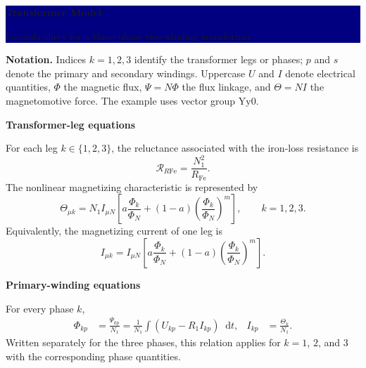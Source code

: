 \documentclass[11pt,a4paper]{article}
\newenvironment{formulaBox}[1]{%
	\par\medskip
	{\sffamily\bfseries\large\color{navy}#1}\par\nobreak\smallskip
	\def\FrameCommand{\hspace{1pt}{\color{blue}\vrule width 2.2pt}\hspace{8pt}}%
	\MakeFramed{\advance\hsize-11.2pt\FrameRestore}%
}{\endMakeFramed\par\smallskip}
\newenvironment{noteBox}{%
	\par\smallskip
	\def\FrameCommand{\hspace{1pt}{\color{gold}\vrule width 2.2pt}%
		\colorbox{shadecolor}}%
	\MakeFramed{\advance\hsize-2\width\advance\hsize-2\fboxsep\FrameRestore}%
}{\endMakeFramed\par\smallskip}
\newcommand{\diff}{\mathop{}\!\mathrm{d}}
\newcommand{\Rmag}{\mathcal{R}}
\begin{document}
	
	\begingroup
	\setlength{\fboxsep}{8mm}%
	\noindent\colorbox{navy}{%
		\parbox{\dimexpr\textwidth-2\fboxsep\relax}{%
			{\sffamily\bfseries\fontsize{25}{29}\selectfont\color{white}
				Transformer Model}\par
			\vspace{2mm}
			{\sffamily\fontsize{15}{18}\selectfont\color{white!85}
				Formula sheet for a three-phase two-winding transformer}%
	}}
	\endgroup
	
	\vspace{3mm}
	\begin{noteBox}
		\textbf{Notation.} Indices $k=1,2,3$ identify the transformer legs or phases;
		$p$ and $s$ denote the primary and secondary windings. Uppercase $U$ and $I$
		denote electrical quantities, $\Phi$ the magnetic flux, $\Psi=N\Phi$ the flux
		linkage, and $\Theta=NI$ the magnetomotive force. The example uses vector group
		$\mathrm{Yy0}$.
	\end{noteBox}
	
	\begin{formulaBox}{Transformer-leg equations}
		For each leg $k\in\{1,2,3\}$, the reluctance associated with the iron-loss
		resistance is
		\begin{equation}
			\Rmag_{R\mathrm{Fe}}=\frac{N_1^2}{R_{\mathrm{Fe}}}.
		\end{equation}
		The nonlinear magnetizing characteristic is represented by
		\begin{equation}
			\Theta_{\mu k}=N_1 I_{\mu N}
			\left[
			a\frac{\Phi_k}{\Phi_N}
			+(1-a)\left(\frac{\Phi_k}{\Phi_N}\right)^m
			\right],
			\qquad k=1,2,3.
		\end{equation}
		Equivalently, the magnetizing current of one leg is
		\begin{equation}
			I_{\mu k}=I_{\mu N}
			\left[
			a\frac{\Phi_k}{\Phi_N}
			+(1-a)\left(\frac{\Phi_k}{\Phi_N}\right)^m
			\right].
		\end{equation}
	\end{formulaBox}
	
	\begin{formulaBox}{Primary-winding equations}
		For every phase $k$,
		\begin{align}
			\Phi_{kp}
			&=\frac{\Psi_{kp}}{N_1}
			=\frac{1}{N_1}\int\!\left(U_{kp}-R_1I_{kp}\right)\diff t,
			& I_{kp}&=\frac{\Theta_k}{N_1}.
		\end{align}
		Written separately for the three phases, this relation applies for
		$k=1$, $2$, and $3$ with the corresponding phase quantities.
	\end{formulaBox}
	
\end{document}
